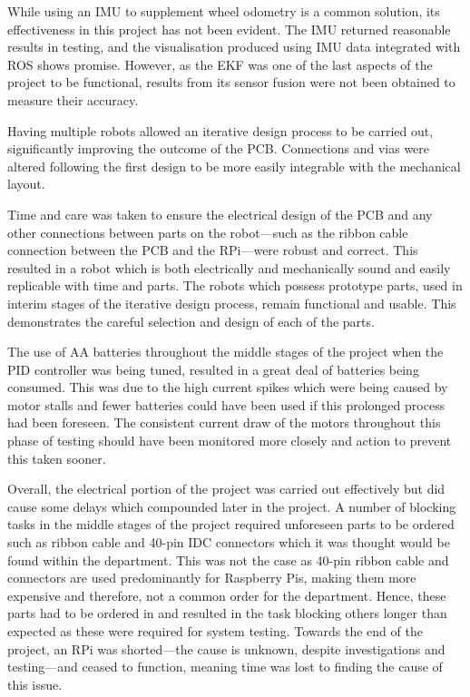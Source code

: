While using an IMU to supplement wheel odometry is a common solution, its
effectiveness in this project has not been evident. The IMU
returned reasonable results in testing, and the visualisation produced using
IMU data integrated with ROS shows promise. However, as the EKF was one of the last aspects of the project to be functional, results from its sensor fusion were not been obtained to
measure their accuracy.

Having multiple robots allowed an
iterative design process to be carried out, significantly improving the outcome
of the PCB. Connections and vias were altered following the first design to be
more easily integrable with the mechanical layout.

Time and care was taken to ensure the electrical design of the PCB and any other
connections between parts on the robot---such as the ribbon cable connection
between the PCB and the RPi---were robust and correct. This resulted
in a robot which is both electrically and mechanically sound and easily replicable
with time and parts. The robots which possess prototype parts, used in
interim stages of the iterative design process, remain functional and usable.
This demonstrates the careful selection and design of each of the parts.

The use of AA batteries throughout the middle stages of the project when the PID
controller was being tuned, resulted in a great deal of batteries being consumed.
This was due to the high current spikes which were being caused by motor stalls and
fewer batteries could have been used if this prolonged process had been foreseen. The
consistent current draw of the motors throughout this phase of testing should have
been monitored more closely and action to prevent this taken sooner.

Overall, the electrical portion of the project was carried out effectively but did
cause some delays which compounded later in the project. A number of
blocking tasks in the middle stages of the project required unforeseen parts to be
ordered such as ribbon cable and 40-pin IDC connectors which it was thought would
be found within the department. This was not the case as 40-pin ribbon cable and
connectors are used predominantly for Raspberry Pis, making them more expensive
and therefore, not a common order for the department. Hence, these parts had to be ordered in and resulted in the task blocking
others longer than expected as these were required for system testing. Towards the end of the project, an RPi was
shorted---the cause is unknown, despite investigations and testing---and ceased to function,
meaning time was lost to finding the cause of this issue.

